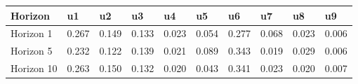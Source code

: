 \begin{tabular}{llllllllll}
\toprule
Horizon & u1 & u2 & u3 & u4 & u5 & u6 & u7 & u8 & u9 \\
\midrule
Horizon 1 & 0.267 & 0.149 & 0.133 & 0.023 & 0.054 & 0.277 & 0.068 & 0.023 & 0.006 \\
Horizon 5 & 0.232 & 0.122 & 0.139 & 0.021 & 0.089 & 0.343 & 0.019 & 0.029 & 0.006 \\
Horizon 10 & 0.263 & 0.150 & 0.132 & 0.020 & 0.043 & 0.341 & 0.023 & 0.020 & 0.007 \\
\bottomrule
\end{tabular}
